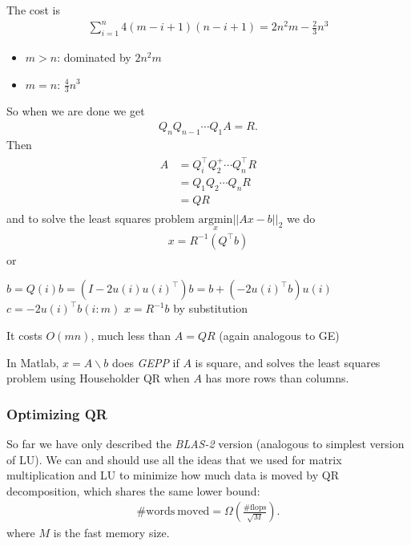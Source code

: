 \documentclass[11pt]{article}
\numberwithin{equation}{section}
\begin{document}
The cost is \begin{align*}
    \sum_{i=1}^{n} 4(m-i+1)(n-i+1)=2n^2m - \frac{2}{3}n^3
\end{align*}
\begin{itemize}
    \item $m > n$: dominated by $2n^2m$
    \item $m=n$: $\frac{4}{3}n^3$
\end{itemize}
So when we are done we get \begin{align*}
    Q_{n} Q_{n-1} \cdots Q_{1} A=R.
\end{align*}
Then
\begin{align*}
    \begin{aligned}
        A &=Q_{i}^{\top} Q_{2}^{+} \cdots Q_{n}^{\top}  R \\
        &=Q_{1} Q_{2} \cdots Q_{n} R \\
        &=Q R
        \end{aligned}
\end{align*}
and to solve the least squares problem $\underset{x}{\mathrm{argmin}}||Ax-b||_2$ we do \begin{align*}
    x = R^{-1} ( Q^\top b) 
\end{align*}
or 
\begin{algorithmfrm}
    \begin{algorithmic}[1]
            \State $b = Q(i)b = (I-2u(i)u(i)^\top)b = b + (-2u(i)^\top b)u(i)$
            \State $c = -2u(i)^\top b(i:m)$
        \EndFor
        \State $x=R^{-1}b$ by substitution
    \end{algorithmic}
\end{algorithmfrm}
It costs $O(mn)$, much less than $A = QR$ (again analogous to GE)

In Matlab, $x = A\backslash b$ does \textit{GEPP} if $A$ is square, and solves the least squares problem using Householder QR when $A$ has more rows than columns.

\subsubsection{Optimizing QR}
So far we have only described the \textit{BLAS-2} version (analogous to simplest version of LU). 
We can and should use all the ideas that we used for matrix multiplication and LU to minimize how much data is moved by QR decomposition, 
which shares the same lower bound: \begin{align*}
    \#\mathrm{words \ moved} = \Omega(\frac{\#\mathrm{flops}}{\sqrt{M}}).
\end{align*}
where $M$ is the fast memory size.
\end{document}
